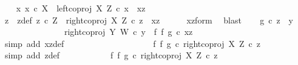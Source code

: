 \begin{isabellebody}
\isanewline
\ \ \isamarkupfalse%
\ {\isachardoublequoteopen}{\isasymnexists}x{\isachardot}{\kern0pt}\ x\ {\isasymin}\isactrlsub c\ X\ {\isasymand}\ left{\isacharunderscore}{\kern0pt}coproj\ X\ Z\ {\isasymcirc}\isactrlsub c\ x\ {\isacharequal}{\kern0pt}\ xz{\isachardoublequoteclose}\isanewline
\ \ \isamarkupfalse%
\ \isamarkupfalse%
\ z\ \ z{\isacharunderscore}{\kern0pt}def{\isacharcolon}{\kern0pt}\ {\isachardoublequoteopen}z\ {\isasymin}\isactrlsub c\ Z\ {\isasymand}\ right{\isacharunderscore}{\kern0pt}coproj\ X\ Z\ {\isasymcirc}\isactrlsub c\ z\ {\isacharequal}{\kern0pt}\ xz{\isachardoublequoteclose}\isanewline
\ \ \ \ \isamarkupfalse%
\ xz{\isacharunderscore}{\kern0pt}form\ \isamarkupfalse%
\ blast\isanewline
\ \ \isamarkupfalse%
\ {\isachardoublequoteopen}g\ {\isasymcirc}\isactrlsub c\ z\ {\isacharequal}{\kern0pt}\ y{\isachardoublequoteclose}\isanewline
\ \ \ \ \isamarkupfalse%
\ {\isacharminus}{\kern0pt}\ \isanewline
\ \ \ \ \ \ \isamarkupfalse%
\ {\isachardoublequoteopen}right{\isacharunderscore}{\kern0pt}coproj\ Y\ W\ {\isasymcirc}\isactrlsub c\ y\ {\isacharequal}{\kern0pt}\ {\isacharparenleft}{\kern0pt}f\ {\isasymbowtie}\isactrlsub f\ g{\isacharparenright}{\kern0pt}\ {\isasymcirc}\isactrlsub c\ xz{\isachardoublequoteclose}\isanewline
\ \ \ \ \ \ \ \ \isamarkupfalse%
\ {\isacharparenleft}{\kern0pt}simp\ add{\isacharcolon}{\kern0pt}\ xz{\isacharunderscore}{\kern0pt}def{\isacharparenright}{\kern0pt}\ \ \ \ \ \ \ \ \ \isanewline
\ \ \ \ \ \ \isamarkupfalse%
\ \isamarkupfalse%
\ {\isachardoublequoteopen}{\isachardot}{\kern0pt}{\isachardot}{\kern0pt}{\isachardot}{\kern0pt}\ {\isacharequal}{\kern0pt}\ {\isacharparenleft}{\kern0pt}f\ {\isasymbowtie}\isactrlsub f\ g{\isacharparenright}{\kern0pt}\ {\isasymcirc}\isactrlsub c\ right{\isacharunderscore}{\kern0pt}coproj\ X\ Z\ {\isasymcirc}\isactrlsub c\ z{\isachardoublequoteclose}\isanewline
\ \ \ \ \ \ \ \ \isamarkupfalse%
\ {\isacharparenleft}{\kern0pt}simp\ add{\isacharcolon}{\kern0pt}\ z{\isacharunderscore}{\kern0pt}def{\isacharparenright}{\kern0pt}\isanewline
\ \ \ \ \ \ \isamarkupfalse%
\ \isamarkupfalse%
\ {\isachardoublequoteopen}{\isachardot}{\kern0pt}{\isachardot}{\kern0pt}{\isachardot}{\kern0pt}\ {\isacharequal}{\kern0pt}\ {\isacharparenleft}{\kern0pt}{\isacharparenleft}{\kern0pt}f\ {\isasymbowtie}\isactrlsub f\ g{\isacharparenright}{\kern0pt}\ {\isasymcirc}\isactrlsub c\ right{\isacharunderscore}{\kern0pt}coproj\ X\ Z{\isacharparenright}{\kern0pt}\ {\isasymcirc}\isactrlsub c\ z{\isachardoublequoteclose}\isanewline

\end{isabellebody}
